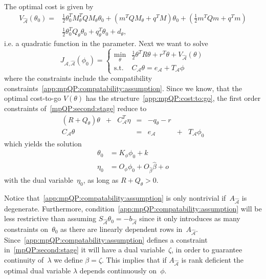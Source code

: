 The optimal cost is given by
%
\begin{equation}\label{app:mpQP:cost:to:go}\begin{split}
	V_{\hat{\mathcal A}}(\theta_0) = &\frac{1}{2}\theta^T_0 M_\theta^T Q M_\theta \theta_0 + \left(m^TQM_\theta + q^TM\right) \theta_0 + 
	\left( \frac{1}{2} m^T Q m + q^T m\right)\\
	&\frac{1}{2} \theta^T_0 Q_\theta \theta_0 + q^T_\theta \theta_0 + d_\theta,
\end{split}\end{equation}
%
i.e. a quadratic function in the parameter.
%
Next we want to solve
%
\begin{equation}\label{mpQP:second:stage}
	J_{\mathcal A,\hat{\mathcal A}}(\phi_0) = \left\{\begin{array}{rl}
	\min_\theta & \frac{1}{2}\theta^TR\theta + r^T\theta + V_{\hat{\mathcal A}}(\theta)\\
	\text{s.t.} & C_{\mathcal A}\theta = e_{\mathcal A} + T_{\mathcal A} \phi
	\end{array}\right.
\end{equation}
%
where the constraints include the compatibility constraints~\eqref{app:mpQP:compatability:assumption}. 
%
Since we know, that the optimal cost-to-go $V(\theta)$ has the structure~\eqref{app:mpQP:cost:to:go},
the first order constraints of~\eqref{mpQP:second:stage} reduce to
%
\begin{equation}\label{mpQP:second:stage:conditions}
	\begin{array}{ccccccc}
		(R + Q_\theta)\theta &+& C^T_{{\mathcal A}}\eta & = & -q_\theta-r && \\
		C_{{\mathcal A}} \theta & & & = & e_{{\mathcal A}}& +& T_{{\mathcal A}}\phi_0
	\end{array}
\end{equation}
%
which yields the solution
%
\begin{equation}
	\begin{split}
	\theta_0 &= K_\phi \phi_0 + k\\
	\eta_0 &= O_\phi \phi_0 + O_{\hat\beta} \hat\beta + o
	\end{split}
\end{equation}
%
with the dual variable~$\eta_0$, as long as $R+Q_\theta>0$.

Notice that~\eqref{app:mpQP:compatability:assumption} is only nontrivial if~$A_{\hat{\mathcal A}}$ is degenerate.
%
Furthermore, condition~\eqref{app:mpQP:compatability:assumption} will be less restrictive than assuming 
$S_{\hat{\mathcal A}}\theta_0=-b_{\hat{\mathcal A}}$ since it only introduces as many constraints on~$\theta_0$ 
as there are linearly dependent rows in~$A_{\hat{\mathcal A}}$.
%
Since~\eqref{app:mpQP:compatability:assumption} defines a constraint in~\eqref{mpQP:second:stage} it will have a dual
variable~$\zeta$, in order to guarantee continuity of~$\lambda$ we define $\beta=\zeta$.
%
This implies that if $A_{\hat{\mathcal A}}$ is rank deficient the optimal dual variable $\lambda$
depends continuously on~$\phi$.
%
%
%
